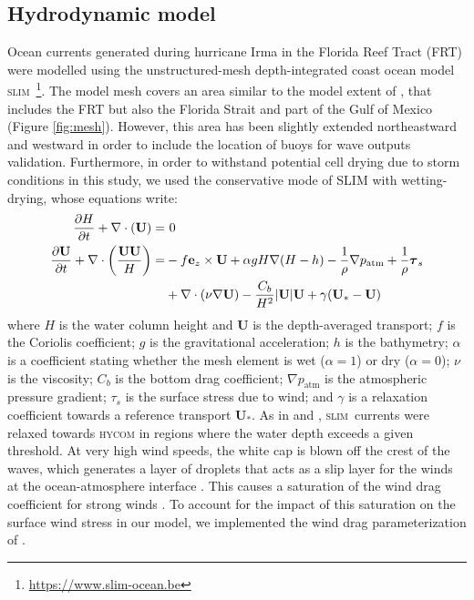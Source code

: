 \documentclass[11pt,a4paper]{article}
\newcommand{\hycom}{\textsc{hycom} }
\newcommand{\slim}{\textsc{slim}\ }
\newcommand{\UV}{\mathbf{U}}
\begin{document}
\subsection{Hydrodynamic model}
Ocean currents generated during hurricane Irma in the Florida Reef Tract (FRT) were modelled using the unstructured-mesh depth-integrated coast ocean model \slim\footnote{\url{https://www.slim-ocean.be}}. The model mesh covers an area similar to the model extent of \cite{dobbelaere2020coupled}, that includes the FRT but also the Florida Strait and part of the Gulf of Mexico (Figure \ref{fig:mesh}). However, this area has been slightly extended northeastward and westward in order to include the location of buoys for wave outputs validation. Furthermore, in order to withstand potential cell drying due to storm conditions in this study, we used the conservative mode of SLIM with wetting-drying, whose equations write:
\begin{equation}
    \begin{split}
        \dfrac{\partial H}{\partial t} +\nabla\cdot(\UV) =& ~0 \\
        \dfrac{\partial \UV}{\partial t}  + \nabla\cdot\left(\dfrac{\UV\UV}{H}\right) =& -f\mathbf{e}_z \times \UV + \alpha gH\nabla(H-h) - \dfrac{1}{\rho}\nabla p_\text{atm} + \dfrac{1}{\rho}\text{\boldmath$\tau$}_s \\
         &+\nabla\cdot(\nu\nabla\UV) - \dfrac{C_b}{H^2}|\UV|\UV + \gamma(\UV_\ast-\UV)
    \end{split} \label{eq:slim}
\end{equation}
where $H$ is the water column height and $\UV$ is the depth-averaged transport; $f$ is the Coriolis coefficient; $g$ is the gravitational acceleration; $h$ is the bathymetry; $\alpha$ is a coefficient stating whether the mesh element is wet ($\alpha=1$) or dry ($\alpha=0$); $\nu$  is the viscosity; $C_b$ is the bottom drag coefficient; $\nabla p_\text{atm}$ is the atmospheric pressure gradient; {\boldmath$\tau$}$_s$ is the surface stress due to wind; and $\gamma$ is a relaxation coefficient towards a reference transport $\UV_\ast$. As in \cite{frys2020fine} and \cite{dobbelaere2020coupled}, \slim currents were relaxed towards \hycom \citep{chassignet2007hycom} in regions where the water depth exceeds a given threshold. At very high wind speeds, the white cap is blown off the crest of the waves, which generates a layer of droplets that acts as a slip layer for the winds at the ocean-atmosphere interface \citep{holthuijsen2012wind}. This causes a saturation of the wind drag coefficient for strong winds \citep{donelan2004limiting,powell2003reduced}. To account for the impact of this saturation on the surface wind stress in our model, we implemented the wind drag parameterization of \cite{moon2007physics}.
\end{document}
